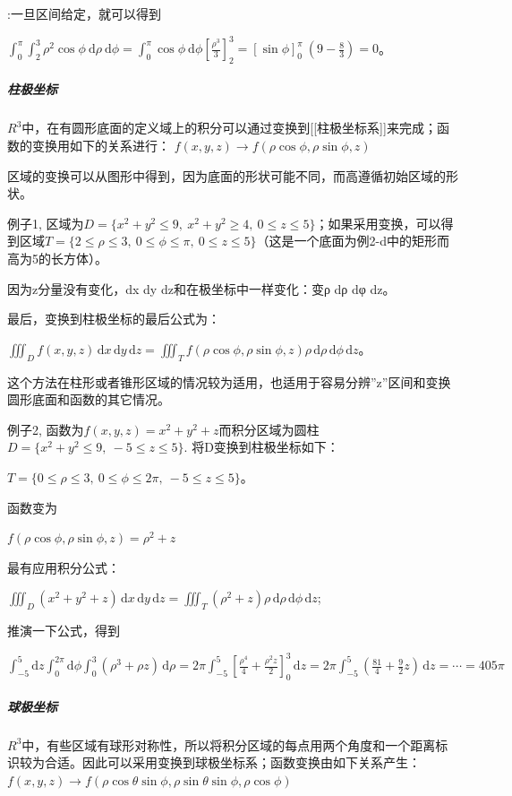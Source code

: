 \documentclass[UTF-8]{ctexart}
\begin{document}
:一旦区间给定，就可以得到

$\int_0^{\pi} \int_2^3 \rho^2 \cos \phi \ \mathrm{d} \rho \ \mathrm{d} \phi = \int_0^{\pi} \cos \phi \ \mathrm{d} \phi \left[ \frac{\rho^3}{3} \right]_2^3 = \left[ \sin \phi \right]_0^{\pi} \ \left(9 - \frac{8}{3} \right) = 0$。

\subparagraph{柱极坐标}
$R^3$中，在有圆形底面的定义域上的积分可以通过变换到[[柱极坐标系]]来完成；函数的变换用如下的关系进行：
$f(x,y,z) \rightarrow f(\rho \cos \phi, \rho \sin \phi, z)$

区域的变换可以从图形中得到，因为底面的形状可能不同，而高遵循初始区域的形状。

例子1,
区域为$D = \{ x^2 + y^2 \le 9, \ x^2 + y^2 \ge 4, \ 0 \le z \le 5 \}$；如果采用变换，可以得到区域$T = \{ 2 \le \rho \le 3, \ 0 \le \phi \le \pi, \ 0 \le z \le 5 \}$（这是一个底面为例2-d中的矩形而高为5的长方体）。

因为z分量没有变化，dx dy dz和在极坐标中一样变化：变ρ dρ dφ dz。

最后，变换到柱极坐标的最后公式为：

$\iiint_D f(x,y,z) \, \mathrm{d}x\, \mathrm{d}y\, \mathrm{d}z = \iiint_T f(\rho \cos \phi, \rho \sin \phi, z) \rho \, \mathrm{d}\rho\, \mathrm{d}\phi\, \mathrm{d}z$。

这个方法在柱形或者锥形区域的情况较为适用，也适用于容易分辨''z''区间和变换圆形底面和函数的其它情况。

例子2,
函数为$f(x,y,z) = x^2 + y^2 + z$而积分区域为圆柱$D = \{ x^2 + y^2 \le 9, \ -5 \le z \le 5 \}$.
将D变换到柱极坐标如下：

$T = \{ 0 \le \rho \le 3, \ 0 \le \phi \le 2 \pi, \ -5 \le z \le 5 \}$。

函数变为

$f(\rho \cos \phi, \rho \sin \phi, z) = \rho^2 + z$

最有应用积分公式：

$\iiint_D (x^2 + y^2 +z) \, \mathrm{d}x\, \mathrm{d}y\, \mathrm{d}z = \iiint_T ( \rho^2 + z) \rho \, \mathrm{d}\rho\, \mathrm{d}\phi\, \mathrm{d}z$;

推演一下公式，得到

$\int_{-5}^5 \mathrm{d}z \int_0^{2 \pi} \mathrm{d}\phi \int_0^3 ( \rho^3 + \rho z )\, \mathrm{d}\rho = 2 \pi \int_{-5}^5 \left[ \frac{\rho^4}{4} + \frac{\rho^2 z}{2} \right]_0^3 \, \mathrm{d}z = 2 \pi \int_{-5}^5 \left( \frac{81}{4} + \frac{9}{2} z\right)\, \mathrm{d}z = \cdots = 405 \pi$

\subparagraph{球极坐标}
$R^3$中，有些区域有球形对称性，所以将积分区域的每点用两个角度和一个距离标识较为合适。因此可以采用变换到球极坐标系；函数变换由如下关系产生：
$f(x,y,z) \longrightarrow f(\rho \cos \theta \sin \phi, \rho \sin \theta \sin \phi, \rho \cos \phi)$
\end{document}

